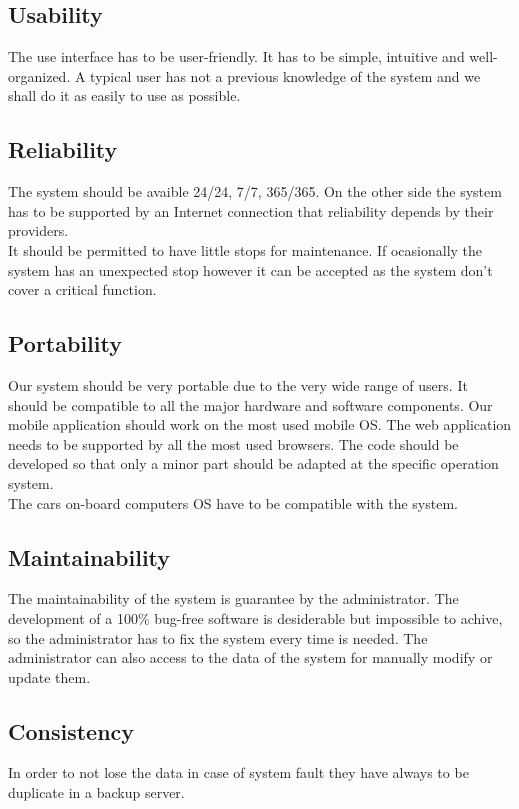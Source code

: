 \subsection{Usability}
\label{sec:usability}
 The use interface has to be user-friendly. It has to be simple, intuitive and well-organized. A typical user has not a previous knowledge of the system and we shall do it as easily to use as possible.

\subsection{Reliability}
The system should be avaible 24/24, 7/7, 365/365. On the other side the system has to be supported by an Internet connection that reliability depends by their providers.  
\\It should be permitted to have little stops for maintenance. If ocasionally the system has an unexpected stop however it can be accepted as the system don't cover a critical function. 

\subsection{Portability}
Our system should be very portable due to the very wide range of users. It should be compatible to all the major hardware and software components. Our mobile application should work on the most used mobile OS. The web application needs to be supported by all the most used browsers. The code should be developed so that only a minor part should be adapted at the specific operation system.
\\The cars on-board computers OS have to be compatible with the system. %

\subsection{Maintainability}
The maintainability of the system is guarantee by the administrator. The development of a 100\% bug-free software is desiderable but impossible to achive, so the administrator has to fix the system every time is needed. The administrator can also access to the data of the system for manually modify or update them.

\subsection{Consistency}
In order to not lose the data in case of system fault they have always to be duplicate in a backup server.  

